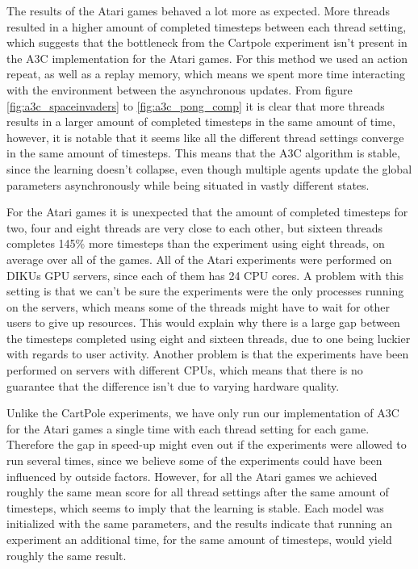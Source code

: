 \documentclass[11pt]{article}
\begin{document}
The results of the Atari games behaved a lot more as expected.
More threads resulted in a higher amount of completed timesteps between each thread setting,
which suggests that the bottleneck from the Cartpole experiment isn't present in
the A3C implementation for the Atari games.
For this method we used an action repeat, as well as a replay memory,
which means we spent more time interacting with the environment
between the asynchronous updates.
From figure \ref{fig:a3c_spaceinvaders} to \ref{fig:a3c_pong_comp}
it is clear that more threads results in a larger amount of completed timesteps
in the same amount of time,
however, it is notable that it seems like all the different thread
settings converge in the same amount of timesteps.
This means that the A3C algorithm is stable, since the learning
doesn't collapse, even though multiple agents update the global parameters asynchronously 
while being situated in vastly different states.


For the Atari games it is unexpected that the amount of completed timesteps
for two, four and eight threads are very close to each other, but
sixteen threads completes 145\% more timesteps than the experiment using eight
threads, on average over all of the games.
All of the Atari experiments were performed on DIKUs GPU servers, since each of them
has 24 CPU cores.
A problem with this setting is that we can't be sure 
the experiments were the only processes running on the servers, which means
some of the threads might have to wait for other users to
give up resources.
This would explain why there is a large gap between the timesteps
completed using eight and sixteen threads, due to one
being luckier with regards to user activity.
Another problem is that the experiments have been performed on servers with different CPUs,
which means that there is no guarantee that the difference isn't due to
varying hardware quality.

Unlike the CartPole experiments, we have only run our implementation
of A3C for the Atari games a single time with each thread setting for each game.
Therefore the gap in speed-up might even out if the experiments were allowed to run
several times, since we believe some of the experiments could have been influenced
by outside factors.
However, for all the Atari games we achieved roughly the same mean score
for all thread settings after the same amount of timesteps,
which seems to imply that the learning is stable.
Each model was initialized
with the same parameters, and the results indicate that running an experiment
an additional time, for the same amount of timesteps,
would yield roughly the same result.
\end{document}
